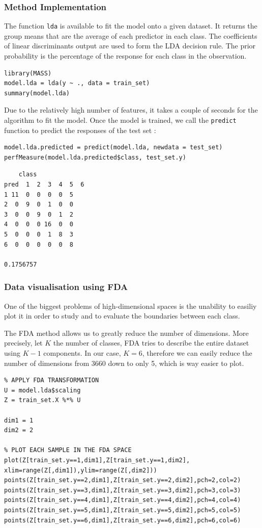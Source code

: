 \documentclass[]{report}
\begin{document}
\subsubsection{Method Implementation}
The function \texttt{lda} is available to fit the model onto a given dataset. It returns the group means that are the average of each predictor in each class. The coefficients of linear discriminants output are used to form the LDA decision rule. The prior probability is the percentage of the response for each class in the observation.

\begin{lstlisting}
library(MASS)
model.lda = lda(y ~ ., data = train_set)
summary(model.lda)
\end{lstlisting}

Due to the relatively high number of features, it takes a couple of seconds for the algorithm to fit the model.  Once the model is trained, we call the \texttt{predict} function to predict the responses of the test set : 

\begin{lstlisting}
model.lda.predicted = predict(model.lda, newdata = test_set)
perfMeasure(model.lda.predicted$class, test_set.y)
\end{lstlisting}

\begin{verbatim}
    class
pred  1  2  3  4  5  6
1 11  0  0  0  0  5
2  0  9  0  1  0  0
3  0  0  9  0  1  2
4  0  0  0 16  0  0
5  0  0  0  1  8  3
6  0  0  0  0  0  8

0.1756757
\end{verbatim}

\subsubsection{Data visualisation using FDA}
One of the biggest problems of high-dimensional spaces is the unability to easiliy plot it in order to study and to evaluate the boundaries between each class.

The FDA method allows us to greatly reduce the number of dimensions. More precisely, let $K$ the number of classes, FDA tries to describe the entire dataset using $K-1$ components. In our case, $K = 6$, therefore we can easily reduce the number of dimensions from 3660 down to only 5, which is way easier to plot.

\begin{lstlisting}
% APPLY FDA TRANSFORMATION
U = model.lda$scaling
Z = train_set.X %*% U

dim1 = 1
dim2 = 2

% PLOT EACH SAMPLE IN THE FDA SPACE
plot(Z[train_set.y==1,dim1],Z[train_set.y==1,dim2], xlim=range(Z[,dim1]),ylim=range(Z[,dim2]))
points(Z[train_set.y==2,dim1],Z[train_set.y==2,dim2],pch=2,col=2)
points(Z[train_set.y==3,dim1],Z[train_set.y==3,dim2],pch=3,col=3)
points(Z[train_set.y==4,dim1],Z[train_set.y==4,dim2],pch=4,col=4)
points(Z[train_set.y==5,dim1],Z[train_set.y==5,dim2],pch=5,col=5)
points(Z[train_set.y==6,dim1],Z[train_set.y==6,dim2],pch=6,col=6)
\end{lstlisting}
\end{document}
